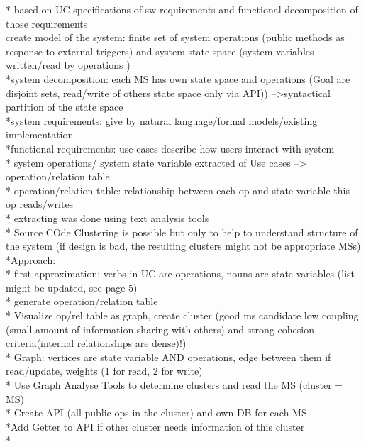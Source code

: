 * based on UC specifications of sw requirements and functional decomposition of those requirements \\
create model of the system: finite set of system operations (public methods as response to external triggers) and system state space (system variables written/read by operations )\\
*system decomposition: each MS has own state space and operations (Goal are disjoint sets, read/write of others state space only via API)) -->syntactical partition of the state space \\
*system requirements: give by natural language/formal models/existing implementation \\
*functional requirements: use cases describe how users interact with system \\
* system operations/ system state variable extracted of Use cases --> operation/relation table\\
* operation/relation table: relationship between each op and state variable this op reads/writes\\
* extracting was done using text analysis tools\\
* Source COde Clustering is possible but only to help to understand structure of the system (if design is bad, the resulting clusters might not be appropriate MSs)\\

*Approach: \\
* first approximation:  verbs in UC are operations, nouns are state variables (list might be updated, see page 5)\\
* generate operation/relation table\\
* Visualize op/rel table as graph, create cluster (good ms candidate low coupling (small amount of information sharing with others) and strong cohesion criteria(internal relationships are dense)!)\\
* Graph: vertices are state variable AND operations, edge between them if read/update, weights (1 for read, 2 for write)\\
* Use Graph Analyse Tools to determine clusters and read the MS (cluster = MS)\\
* Create API (all public ops in the cluster) and own DB for each MS\\
*Add Getter to API if other cluster needs information of this cluster\\
* 


